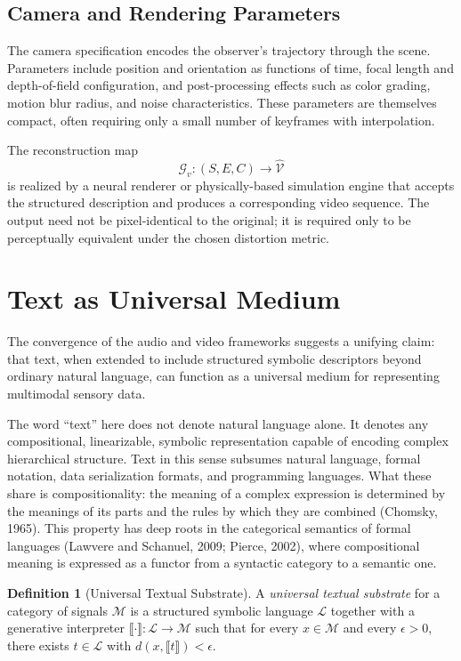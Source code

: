 \documentclass[11pt,a4paper]{article}
\theoremstyle{definition}
\newtheorem{definition}[theorem]{Definition}
\theoremstyle{remark}
\begin{document}
\subsection{Camera and Rendering Parameters}

The camera specification encodes the observer's trajectory through the scene. Parameters include position and orientation as functions of time, focal length and depth-of-field configuration, and post-processing effects such as color grading, motion blur radius, and noise characteristics. These parameters are themselves compact, often requiring only a small number of keyframes with interpolation.

The reconstruction map
\[
\mathcal{G}_v : (S, E, C) \rightarrow \widehat{\mathcal{V}}
\]
is realized by a neural renderer or physically-based simulation engine that accepts the structured description and produces a corresponding video sequence. The output need not be pixel-identical to the original; it is required only to be perceptually equivalent under the chosen distortion metric.

\section{Text as Universal Medium}
\label{sec:text_medium}

The convergence of the audio and video frameworks suggests a unifying claim: that text, when extended to include structured symbolic descriptors beyond ordinary natural language, can function as a universal medium for representing multimodal sensory data.

The word ``text'' here does not denote natural language alone. It denotes any compositional, linearizable, symbolic representation capable of encoding complex hierarchical structure. Text in this sense subsumes natural language, formal notation, data serialization formats, and programming languages. What these share is compositionality: the meaning of a complex expression is determined by the meanings of its parts and the rules by which they are combined (Chomsky, 1965). This property has deep roots in the categorical semantics of formal languages (Lawvere and Schanuel, 2009; Pierce, 2002), where compositional meaning is expressed as a functor from a syntactic category to a semantic one.

\begin{definition}[Universal Textual Substrate]
A \emph{universal textual substrate} for a category of signals $\mathcal{M}$ is a structured symbolic language $\mathcal{L}$ together with a generative interpreter $\llbracket \cdot \rrbracket : \mathcal{L} \rightarrow \mathcal{M}$ such that for every $x \in \mathcal{M}$ and every $\epsilon > 0$, there exists $t \in \mathcal{L}$ with $d(x, \llbracket t \rrbracket) < \epsilon$.
\end{definition}
\end{document}

